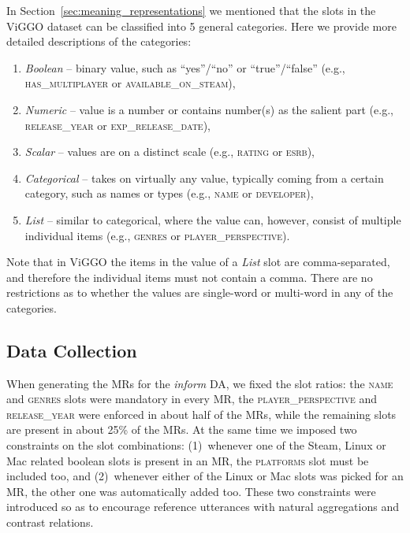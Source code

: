 \documentclass[11pt,a4paper]{article}
\begin{document}
In Section~\ref{sec:meaning_representations} we mentioned that the slots in the ViGGO dataset can be classified into 5 general categories. Here we provide more detailed descriptions of the categories:
\begin{enumerate}[itemsep=0pt, parsep=0pt]
    \item \emph{Boolean} -- binary value, such as ``yes''/``no'' or ``true''/``false'' (e.g., \textsc{has\_multiplayer} or \textsc{available\_on\_steam}),
    \item \emph{Numeric} -- value is a number or contains number(s) as the salient part (e.g., \textsc{release\_year} or \textsc{exp\_release\_date}),
    \item \emph{Scalar} -- values are on a distinct scale (e.g., \textsc{rating} or \textsc{esrb}),
    \item \emph{Categorical} -- takes on virtually any value, typically coming from a certain category, such as names or types (e.g., \textsc{name} or \textsc{developer}),
    \item \emph{List} -- similar to categorical, where the value can, however, consist of multiple individual items (e.g., \textsc{genres} or \textsc{player\_perspective}).
\end{enumerate}
Note that in ViGGO the items in the value of a \emph{List} slot are comma-separated, and therefore the individual items must not contain a comma. There are no restrictions as to whether the values are single-word or multi-word in any of the categories.


\subsection{Data Collection}







When generating the MRs for the \emph{inform} DA, we fixed the slot ratios: the \textsc{name} and \textsc{genres} slots were mandatory in every MR, the \textsc{player\_perspective} and \textsc{release\_year} were enforced in about half of the MRs, while the remaining slots are present in about 25\% of the MRs. At the same time we imposed two constraints on the slot combinations: (1)~whenever one of the Steam, Linux or Mac related boolean slots is present in an MR, the \textsc{platforms} slot must be included too, and (2)~whenever either of the Linux or Mac slots was picked for an MR, the other one was automatically added too. These two constraints were introduced so as to encourage reference utterances with natural aggregations and contrast relations.
\end{document}
